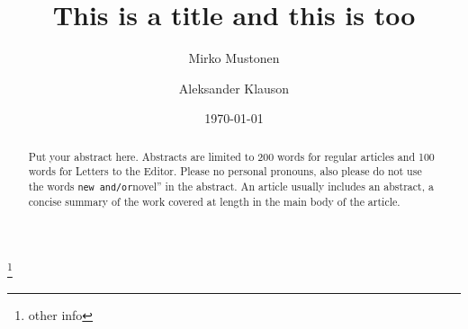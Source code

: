 \documentclass[preprint]{JASA}
\begin{document}

\title[A subtitle goes on another line]{This is a title and this is too}



\author{Mirko Mustonen}
\thanks{other info}
\author{Aleksander Klauson}






\date{\today}

\begin{abstract}
Put your abstract here. Abstracts are limited to 200 words for regular
articles and 100 words for Letters to the Editor. Please no personal
pronouns, also please do not use the words
\texttt{new\textquotesingle{}\textquotesingle{}\ and/or}novel'' in the
abstract. An article usually includes an abstract, a concise summary of
the work covered at length in the main body of the article.
\end{abstract}


\maketitle
\end{document}
